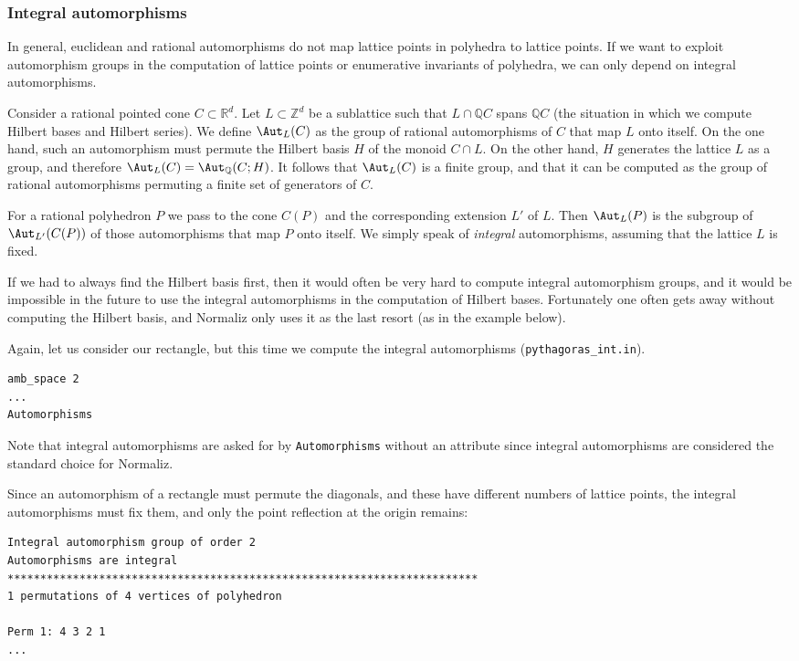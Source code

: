 \documentclass[12pt,a4paper]{scrartcl}
\theoremstyle{definition}
\def\ZZ{{\mathbb Z}}
\def\QQ{{\mathbb Q}}
\def\RR{{\mathbb R}}
\begin{document}
\subsubsection{Integral automorphisms}

In general, euclidean and rational automorphisms do not map lattice points in polyhedra to lattice points. If we want to exploit automorphism groups in the computation of lattice points or enumerative invariants of polyhedra, we can only depend on integral automorphisms.

Consider a rational pointed cone $C\subset\RR^d$. Let $L\subset\ZZ^d$ be a sublattice such that $L\cap \QQ C$ spans $\QQ C$ (the situation in which we compute Hilbert bases and Hilbert series). We define $\Aut_L(C)$ as the group of rational automorphisms of $C$ that map $L$ onto itself. On the one hand, such an automorphism must permute the Hilbert basis $H$ of the monoid $C\cap L$. On the other hand, $H$ generates the lattice $L$ as a group, and therefore $\Aut_L(C)=\Aut_\QQ(C;H)$. It follows that $\Aut_L(C)$ is a finite group, and that it can be computed as the group of rational automorphisms permuting a finite set of generators of $C$.

For a rational polyhedron $P$ we pass to the cone $C(P)$ and the corresponding extension $L'$ of $L$. Then $\Aut_L(P)$ is the subgroup of $\Aut_{L'}(C(P))$ of those automorphisms that map $P$ onto itself. We simply speak of \emph{integral} automorphisms, assuming that the lattice $L$ is fixed.

If we had to always find the Hilbert basis first, then it would often be very hard to compute integral automorphism groups, and it would be impossible in the future to use the integral automorphisms in the computation of Hilbert bases. Fortunately one often gets away without computing the Hilbert basis, and Normaliz only uses it as the last resort (as in the example below).

Again, let us consider our rectangle, but this time we compute the integral automorphisms (\verb|pythagoras_int.in|).
\begin{Verbatim}
amb_space 2
...
Automorphisms
\end{Verbatim}
Note that integral automorphisms are asked for by \verb|Automorphisms| without an attribute since integral automorphisms are considered the standard choice for Normaliz.

Since an automorphism of a rectangle must permute the diagonals, and these have different numbers of lattice points, the integral automorphisms must fix them, and only the point reflection at the origin remains:
\begin{Verbatim}
Integral automorphism group of order 2
Automorphisms are integral
************************************************************************
1 permutations of 4 vertices of polyhedron

Perm 1: 4 3 2 1
...
\end{Verbatim}
\end{document}
